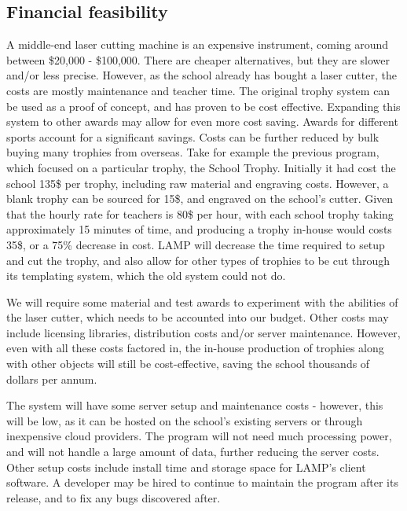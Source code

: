 \documentclass[oneside,openany,11pt,a4paper]{report}
\begin{document}
\subsection{Financial feasibility}
A middle-end laser cutting machine is an expensive instrument, coming around between \$20,000 - \$100,000. There are cheaper alternatives, but they are slower and/or less precise. However, as the school already has bought a laser cutter, the costs are mostly maintenance and teacher time.
The original trophy system can be used as a proof of concept, and has proven to be cost effective. Expanding this system to other awards may allow for even more cost saving. Awards for different sports account for a significant savings. Costs can be further reduced by bulk buying many trophies from overseas.
Take for example the previous program, which focused on a particular trophy, the School Trophy. Initially it had cost the school 135\$ per trophy, including raw material and engraving costs. However, a blank trophy can be sourced for 15\$, and engraved on the school's cutter. Given that the hourly rate for teachers is 80\$ per hour, with each school trophy taking approximately 15 minutes of time, and producing a trophy in-house would costs 35\$, or a 75\% decrease in cost. LAMP will decrease the time required to setup and cut the trophy, and also allow for other types of trophies to be cut through its templating system, which the old system could not do.

We will require some material and test awards to experiment with the abilities of the laser cutter, which needs to be accounted into our budget. Other costs may include licensing libraries, distribution costs and/or server maintenance. However, even with all these costs factored in, the in-house production of trophies along with other objects will still be cost-effective, saving the school thousands of dollars per annum.

The system will have some server setup and maintenance costs - however, this will be low, as it can be hosted on the school’s existing servers or through inexpensive cloud providers. The program will not need much processing power, and will not handle a large amount of data, further reducing the server costs. Other setup costs include install time and storage space for LAMP’s client software. A developer may be hired to continue to maintain the program after its release, and to fix any bugs discovered after.
\end{document}
